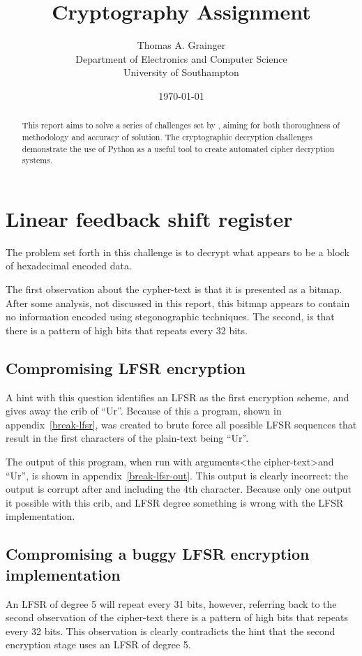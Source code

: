 \documentclass[pdftex, 12pt, a4paper]{article}
\title{Cryptography Assignment}
\author{
        Thomas A. Grainger \\
                Department of Electronics and Computer Science\\
        University of Southampton\\
}
\date{\today}
\begin{document}
\maketitle

\begin{abstract}
This report aims to solve a series of challenges set by \textcite{instructions},
aiming for both thoroughness of methodology and accuracy of solution.  The
cryptographic decryption challenges demonstrate the use of Python as a useful
tool to create automated cipher decryption systems.
\end{abstract}

\tableofcontents
\pagebreak
\section{Linear feedback shift register}

The problem set forth in this challenge is to decrypt what appears to be a block
of hexadecimal encoded data.

The first observation about the cypher-text is that it is presented as a bitmap.
After some analysis, not discussed in this report, this bitmap appears to
contain no information encoded using stegonographic techniques.  The second, is
that there is a pattern of high bits that repeats every 32 bits.

\subsection{Compromising LFSR encryption}
A hint with this question identifies an LFSR as the first encryption scheme, and
gives away the crib of ``Ur''.  Because of this a program, shown in
appendix~\ref{break-lfsr}, was created to brute force all possible LFSR
sequences that result in the first characters of the plain-text being ``Ur''.

The output of this program, when run with arguments\textless{}the
cipher-text\textgreater and ``Ur'', is shown in appendix~\ref{break-lfsr-out}.
This output is clearly incorrect: the output is corrupt after and including the
4th character.  Because only one output it possible with this crib, and LFSR
degree something is wrong with the LFSR implementation.

\subsection{Compromising a buggy LFSR encryption implementation}
An LFSR of degree 5 will repeat every 31 bits, however, referring back to the
second observation of the cipher-text there is a pattern of high bits that
repeats every 32 bits. This observation is clearly contradicts the hint that the
second encryption stage uses an LFSR of degree 5.
\end{document}

